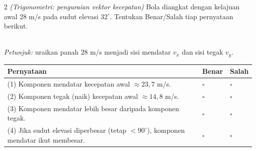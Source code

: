 \documentclass[11pt]{article}
\makeatletter
\newenvironment{bstabel}{%
  \par\smallskip\begin{center}\renewcommand{\arraystretch}{1.35}%
  \begin{tabular}{@{}p{0.72\textwidth}>{\centering\arraybackslash}m{1.5cm}>{\centering\arraybackslash}m{1.5cm}@{}}
  \toprule
  \textbf{Pernyataan} & \textbf{Benar} & \textbf{Salah}\\\midrule}%
  {\bottomrule\end{tabular}\end{center}}
\newcommand{\bs}[1]{#1 & $\square$ & $\square$\\[1pt]}
\makeatother
\begin{document}
\begin{soal}{2 \normalfont\itshape(Trigonometri: penguraian vektor kecepatan)}
Bola diangkat dengan kelajuan awal $28$ m/s pada sudut elevasi $32^\circ$.
Tentukan Benar/Salah tiap pernyataan berikut.

\begin{center}
\\[2pt]
{\small\textit{Petunjuk:} uraikan panah $28$ m/s menjadi sisi mendatar $v_x$ dan sisi tegak $v_y$.}
\end{center}

\begin{bstabel}
  \bs{(1) Komponen mendatar kecepatan awal $\approx 23{,}7$ m/s.}
  \bs{(2) Komponen tegak (naik) kecepatan awal $\approx 14{,}8$ m/s.}
  \bs{(3) Komponen mendatar lebih besar daripada komponen tegak.}
  \bs{(4) Jika sudut elevasi diperbesar (tetap $<90^\circ$), komponen mendatar ikut membesar.}
\end{bstabel}
\end{soal}
\end{document}
